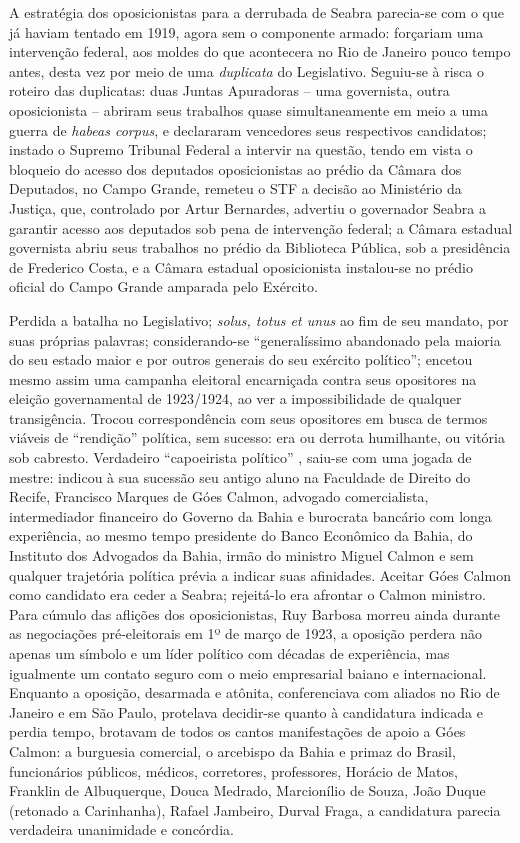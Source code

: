 A estratégia dos oposicionistas para a derrubada de Seabra parecia-se com o que já haviam tentado em 1919, agora sem o componente armado: forçariam uma intervenção federal, aos moldes do que acontecera no Rio de Janeiro pouco tempo antes, desta vez por meio de uma \textit{duplicata} do Legislativo. Seguiu-se à risca o roteiro das duplicatas: duas Juntas Apuradoras -- uma governista, outra oposicionista -- abriram seus trabalhos quase simultaneamente em meio a uma guerra de \textit{habeas corpus}, e declararam vencedores seus respectivos candidatos; instado o Supremo Tribunal Federal a intervir na questão, tendo em vista o bloqueio do acesso dos deputados oposicionistas ao prédio da Câmara dos Deputados, no Campo Grande, remeteu o STF a decisão ao Ministério da Justiça, que, controlado por Artur Bernardes, advertiu o governador Seabra a garantir acesso aos deputados sob pena de intervenção federal; a Câmara estadual governista abriu seus trabalhos no prédio da Biblioteca Pública, sob a presidência de Frederico Costa, e a Câmara estadual oposicionista instalou-se no prédio oficial do Campo Grande amparada pelo Exército.

Perdida a batalha no Legislativo; \textit{solus, totus et unus} ao fim de seu mandato, por suas próprias palavras; considerando-se ``generalíssimo abandonado pela maioria do seu estado maior e por outros generais do seu exército político''; encetou mesmo assim uma campanha eleitoral encarniçada contra seus opositores na eleição governamental de 1923/1924, ao ver a impossibilidade de qualquer transigência. Trocou correspondência com seus opositores em busca de termos viáveis de ``rendição'' política, sem sucesso: era ou derrota humilhante, ou vitória sob cabresto. Verdadeiro ``capoeirista político'' \cite[p.~133]{sampaio_partidos_1978}, saiu-se com uma jogada de mestre: indicou à sua sucessão seu antigo aluno na Faculdade de Direito do Recife, Francisco Marques de Góes Calmon, advogado comercialista, intermediador financeiro do Governo da Bahia e burocrata bancário com longa experiência, ao mesmo tempo presidente do Banco Econômico da Bahia, do Instituto dos Advogados da Bahia, irmão do ministro Miguel Calmon e sem qualquer trajetória política prévia a indicar suas afinidades. Aceitar Góes Calmon como candidato era ceder a Seabra; rejeitá-lo era afrontar o Calmon ministro. Para cúmulo das aflições dos oposicionistas, Ruy Barbosa morreu ainda durante as negociações pré-eleitorais em 1º de março de 1923, a oposição perdera não apenas um símbolo e um líder político com décadas de experiência, mas igualmente um contato seguro com o meio empresarial baiano e internacional. Enquanto a oposição, desarmada e atônita, conferenciava com aliados no Rio de Janeiro e em São Paulo, protelava decidir-se quanto à candidatura indicada e perdia tempo, brotavam de todos os cantos manifestações de apoio a Góes Calmon: a burguesia comercial, o arcebispo da Bahia e primaz do Brasil, funcionários públicos, médicos, corretores, professores, Horácio de Matos, Franklin de Albuquerque, Douca Medrado, Marcionílio de Souza, João Duque (retonado a Carinhanha), Rafael Jambeiro, Durval Fraga, a candidatura parecia verdadeira unanimidade e concórdia.

